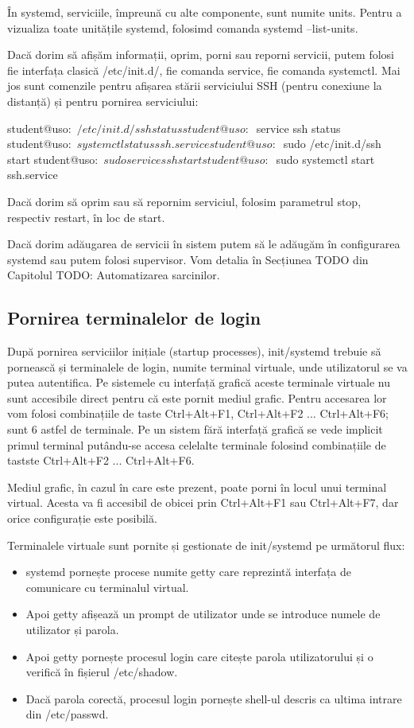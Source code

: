 În systemd, serviciile, împreună cu alte componente, sunt numite units. Pentru a
vizualiza toate unitățile systemd, folosimd comanda systemd --list-units.

Dacă dorim să afișăm informații, oprim, porni sau reporni servicii, putem folosi
fie interfața clasică /etc/init.d/, fie comanda service, fie comanda systemctl.
Mai jos sunt comenzile pentru afișarea stării serviciului SSH (pentru conexiune
la distanță) și pentru pornirea serviciului:

\begin{screen}
student@uso:~$ /etc/init.d/ssh status
student@uso:~$ service ssh status
student@uso:~$ systemctl status ssh.service
student@uso:~$ sudo /etc/init.d/ssh start
student@uso:~$ sudo service ssh start
student@uso:~$ sudo systemctl start ssh.service
\end{screen}

Dacă dorim să oprim sau să repornim serviciul, folosim parametrul stop,
respectiv restart, în loc de start.

Dacă dorim adăugarea de servicii în sistem putem să le adăugăm în configurarea
systemd sau putem folosi supervisor. Vom detalia în Secțiunea TODO din Capitolul
TODO: Automatizarea sarcinilor.

\subsection{Pornirea terminalelor de login}
\label{sec:boot-init-linux-login}

După pornirea serviciilor inițiale (startup processes), init/systemd trebuie să
pornească și terminalele de login, numite terminal virtuale, unde utilizatorul
se va putea autentifica. Pe sistemele cu interfață grafică aceste terminale
virtuale nu sunt accesibile direct pentru că este pornit mediul grafic. Pentru
accesarea lor vom folosi combinațiile de taste Ctrl+Alt+F1, Ctrl+Alt+F2 ...
Ctrl+Alt+F6; sunt 6 astfel de terminale. Pe un sistem fără interfață grafică se
vede implicit primul terminal putându-se accesa celelalte terminale folosind
combinațiile de tastste Ctrl+Alt+F2 ... Ctrl+Alt+F6.

Mediul grafic, în cazul în care este prezent, poate porni în locul unui terminal
virtual. Acesta va fi accesibil de obicei prin Ctrl+Alt+F1 sau Ctrl+Alt+F7, dar
orice configurație este posibilă.

Terminalele virtuale sunt pornite și gestionate de init/systemd pe următorul flux:

\begin{itemize}
	\item systemd pornește procese numite getty care reprezintă interfața de
		comunicare cu terminalul virtual.
	\item Apoi getty afișează un prompt de utilizator unde se introduce
		numele de utilizator și parola.
	\item Apoi getty pornește procesul login care citește parola
		utilizatorului și o verifică în fișierul /etc/shadow.
	\item Dacă parola corectă, procesul login pornește shell-ul descris ca
		ultima intrare din /etc/passwd.
\end{itemize}

